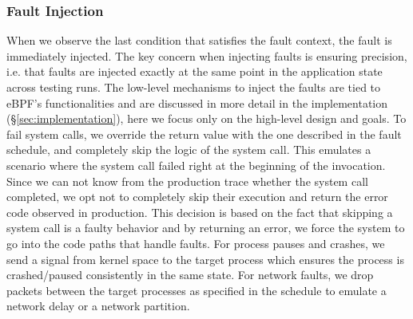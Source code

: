 \subsubsection{Fault Injection}
\label{sec:overview:fi}
When we observe the last condition that satisfies the fault context, the fault is immediately injected.
The key concern when injecting faults is ensuring precision, i.e. that faults are injected exactly at the same point in the application state across testing runs.
The low-level mechanisms to inject the faults are tied to eBPF's functionalities and are discussed in more detail in the implementation (\S\ref{sec:implementation}), here we focus only on the high-level design and goals.
To fail system calls, we override the return value with the one described in the fault schedule, and completely skip the logic of the system call.
This emulates a scenario where the system call failed right at the beginning of the invocation.
Since we can not know from the production trace whether the system call completed, we opt not to completely skip their execution and return the error code observed in production.
This decision is based on the fact that skipping a system call is a faulty behavior and by returning an error, we force the system to go into the code paths that handle faults.
For process pauses and crashes, we send a signal from kernel space to the target process which ensures the process is crashed/paused consistently in the same state.
For network faults, we drop packets between the target processes as specified in the schedule to emulate a network delay or a network partition.
